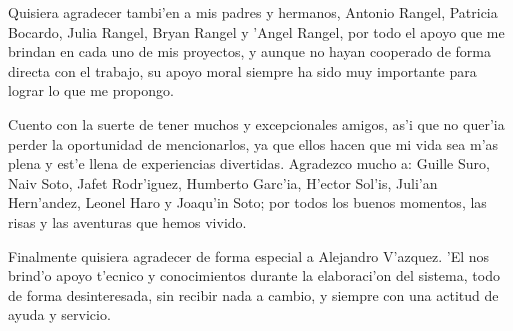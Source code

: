 Quisiera agradecer tambi'en a mis padres y hermanos, Antonio Rangel, Patricia Bocardo, Julia Rangel, Bryan Rangel y 'Angel Rangel, por todo el apoyo que me brindan en cada uno de mis proyectos, y aunque no hayan cooperado de forma directa con el trabajo, su apoyo moral siempre ha sido muy importante para lograr lo que me propongo.

Cuento con la suerte de tener muchos y excepcionales amigos, as'i que no quer'ia perder la oportunidad de mencionarlos, ya que ellos hacen que mi vida sea m'as plena y est'e llena de experiencias divertidas. Agradezco mucho a: Guille Suro, Naiv Soto, Jafet Rodr'iguez, Humberto Garc'ia,  H'ector Sol'is, Juli'an Hern'andez, Leonel Haro y Joaqu'in Soto; por todos los buenos momentos, las risas y las aventuras que hemos vivido.

Finalmente quisiera agradecer de forma especial a Alejandro V'azquez. 'El nos brind'o apoyo t'ecnico y conocimientos durante la elaboraci'on del sistema, todo de forma desinteresada, sin recibir nada a cambio, y siempre con una actitud de ayuda y servicio.

\clearpage